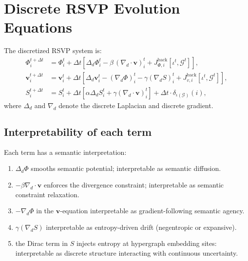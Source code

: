 \section{Discrete RSVP Evolution Equations}

The discretized RSVP system is:
\begin{align}
  \Phi_i^{t+\Delta t}
    &= \Phi_i^t
       + \Delta t \left[
           \Delta_d \Phi_i^t
           - \beta\,(\nabla_d \cdot \mathbf{v})_i^t
           + J_{\Phi,i}^{\mathrm{back}}[\iota^t,\mathcal{G}^t]
         \right], \label{eq:discPhi} \\[6pt]
  \mathbf{v}_i^{t+\Delta t}
    &= \mathbf{v}_i^t
       + \Delta t \left[
           \Delta_d \mathbf{v}_i^t
           - (\nabla_d \Phi)_i^t
           - \gamma (\nabla_d S)_i^t
           + J_{v,i}^{\mathrm{back}}[\iota^t,\mathcal{G}^t]
         \right], \label{eq:discv} \\[6pt]
  S_i^{t+\Delta t}
    &= S_i^t
       + \Delta t \left[
           \alpha \Delta_d S_i^t
           + \gamma (\nabla_d \cdot \mathbf{v})_i^t
         \right]
       + \Delta t \cdot \delta_{\iota(\mathcal{G})}(i), \label{eq:discS}
\end{align}
where $\Delta_d$ and $\nabla_d$ denote the discrete Laplacian and
discrete gradient.

\subsection{Interpretability of each term}

Each term has a semantic interpretation:

\begin{enumerate}
\item $\Delta_d \Phi$  
      smooths semantic potential; interpretable as semantic diffusion.

\item $-\beta \nabla_d \cdot \mathbf{v}$  
      enforces the divergence constraint; interpretable as semantic constraint relaxation.

\item $-\nabla_d \Phi$ in the $\mathbf{v}$-equation  
      interpretable as gradient-following semantic agency.

\item $\gamma (\nabla_d S)$  
      interpretable as entropy-driven drift (negentropic or expansive).

\item the Dirac term in $S$  
      injects entropy at hypergraph embedding sites:  
      interpretable as discrete structure interacting with continuous uncertainty.
\end{enumerate}


